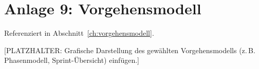 \section*{Anlage 9: Vorgehensmodell}
\label{anh:vorgehensmodell}
Referenziert in Abschnitt~\ref{ch:vorgehensmodell}.

[PLATZHALTER: Grafische Darstellung des gew\"ahlten Vorgehensmodells
(z.\,B. Phasenmodell, Sprint-\"Ubersicht) einf\"ugen.]
